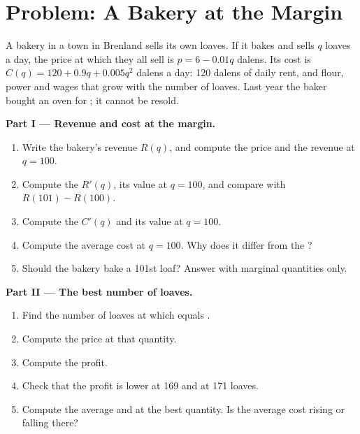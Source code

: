 \section{Problem: A Bakery at the Margin}

\begin{problem}
\label{pb:g11:marginal-reasoning:1}
A bakery in a town in Brenland sells its own loaves. If it bakes and sells $q$ loaves a day, the price at which they all sell is $p = 6 - 0.01q$ dalens. Its cost
is $C(q) = 120 + 0.9q + 0.005q^2$ dalens a day: 120 dalens of daily rent, and flour, power and wages that grow with the number of loaves. Last year the baker
bought an oven for ; it cannot be resold.

\medskip
\noindent\textbf{Part I --- Revenue and cost at the margin.}
\begin{enumerate}
\item Write the bakery's revenue $R(q)$, and compute the price and the revenue at $q = 100$.
\item Compute the  $R'(q)$, its value at $q = 100$, and compare with $R(101) - R(100)$.
\item Compute the  $C'(q)$ and its value at $q = 100$.
\item Compute the average cost at $q = 100$. Why does it differ from the ?
\item Should the bakery bake a 101st loaf? Answer with marginal quantities only.
\end{enumerate}

\medskip
\noindent\textbf{Part II --- The best number of loaves.}
\begin{enumerate}[resume]
\item Find the number of loaves at which  equals .
\item Compute the price at that quantity.
\item Compute the profit.
\item Check that the profit is lower at 169 and at 171 loaves.
\item Compute the average and  at the best quantity. Is the average cost rising or falling there?
\end{enumerate}


\end{problem}
